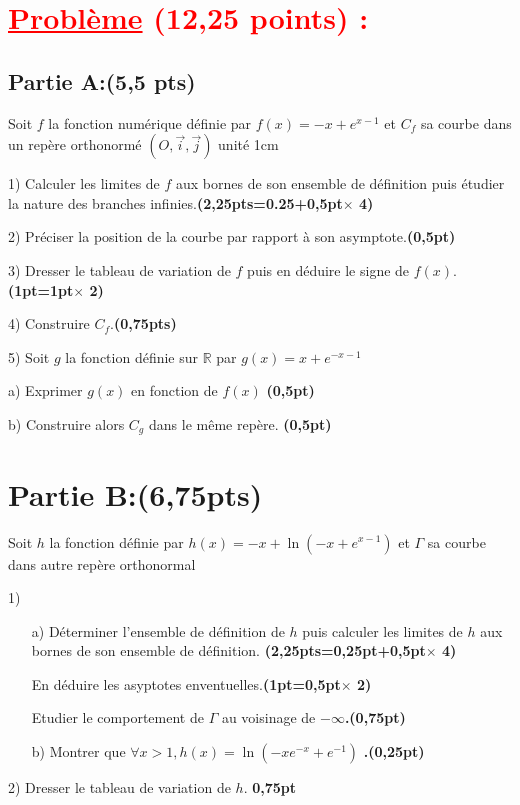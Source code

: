 \documentclass[12pt]{article}
\begin{document}
\section*{\textcolor{red}{\underline{Problème} (12,25 points) :}}
\subsection*{Partie A:(5,5 pts)}
Soit $f$ la fonction numérique définie par $f(x)=-x+e^{x-1}$  et $C_{f}$ sa courbe dans un repère orthonormé $(O,\vec{i},\vec{j})$ unité 1cm

1) Calculer les limites de $f$ aux bornes de son ensemble de définition puis étudier la nature des branches infinies.\textbf{(2,25pts=0.25+0,5pt$\times$ 4)}

2) Préciser la position de la courbe par rapport à son asymptote.\textbf{(0,5pt)}

3) Dresser le tableau de variation de $f$ puis en déduire le signe de $f(x)$.\textbf{(1pt=1pt$\times$ 2)}

4) Construire $C_{f}$.\textbf{(0,75pts)}

5) Soit $g$ la fonction définie sur $\mathbb{R}$ par $g(x)=x+e^{-x-1}$

  a) Exprimer $g(x)$ en fonction de $f(x)$ \textbf{(0,5pt)}
  
  b) Construire alors $C_{g}$ dans le même repère.  \textbf{(0,5pt)}
\section*{Partie B:(6,75pts)}
Soit $h$ la fonction définie par $h(x)=-x+\ln(-x+e^{x-1})$  et $\Gamma$ sa courbe dans autre repère orthonormal

1)
\begin{itemize}
	\item[a)] Déterminer l’ensemble de définition de $h$ puis calculer les limites de $h$ aux bornes de son ensemble de définition. \textbf{(2,25pts=0,25pt+0,5pt$\times$ 4)}
	\item[] En déduire les asyptotes enventuelles.\textbf{(1pt=0,5pt$\times$ 2)}
	\item[]Etudier le comportement de  $\Gamma$ au voisinage de $-\infty$\textbf{.(0,75pt)}

	\item[b)]Montrer que $\forall x>1, h(x)=\ln(-xe^{-x}+e^{-1}) $ \textbf{.(0,25pt)}
\end{itemize}
2) Dresser le tableau de variation de  $h$.   \textbf{0,75pt}
    
\end{document}
